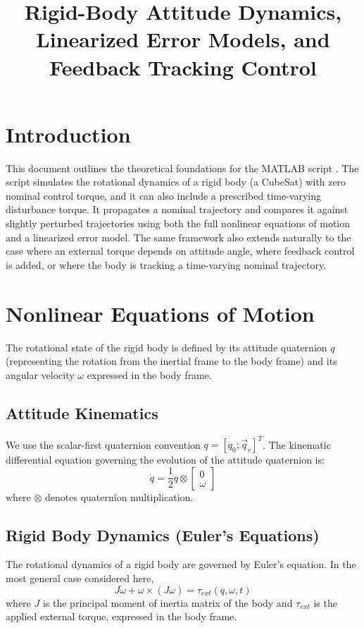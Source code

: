 \documentclass[11pt]{article}
\title{Rigid-Body Attitude Dynamics,\\Linearized Error Models, and Feedback Tracking Control}
\author{}
\date{}
\begin{document}
\maketitle

\section{Introduction}
This document outlines the theoretical foundations for the MATLAB script . The script simulates the rotational dynamics of a rigid body (a CubeSat) with zero nominal control torque, and it can also include a prescribed time-varying disturbance torque. It propagates a nominal trajectory and compares it against slightly perturbed trajectories using both the full nonlinear equations of motion and a linearized error model. The same framework also extends naturally to the case where an external torque depends on attitude angle, where feedback control is added, or where the body is tracking a time-varying nominal trajectory.

\section{Nonlinear Equations of Motion}
The rotational state of the rigid body is defined by its attitude quaternion $q$ (representing the rotation from the inertial frame to the body frame) and its angular velocity $\omega$ expressed in the body frame.

\subsection{Attitude Kinematics}
We use the scalar-first quaternion convention $q = [q_0; \vec{q}_v]^T$. The kinematic differential equation governing the evolution of the attitude quaternion is:
\begin{equation}
    \dot{q} = \frac{1}{2} q \otimes \begin{bmatrix} 0 \\ \omega \end{bmatrix}
\end{equation}
where $\otimes$ denotes quaternion multiplication.

\subsection{Rigid Body Dynamics (Euler's Equations)}
The rotational dynamics of a rigid body are governed by Euler's equation. In the most general case considered here,
\begin{equation}
    J \dot{\omega} + \omega \times (J\omega) = \tau_{ext}(q, \omega, t)
\end{equation}
where $J$ is the principal moment of inertia matrix of the body and $\tau_{ext}$ is the applied external torque, expressed in the body frame.
\end{document}
